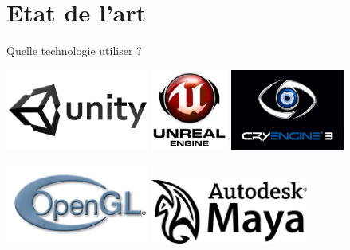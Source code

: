 \documentclass[a4paper,10pt]{beamer}
\begin{document}
	\section{Etat de l'art}
	
	\begin{frame}{Quelle technologie utiliser ?}
		
		\centerline{\includegraphics[height=75pt]{images/techno/unity-logo.png}
			\includegraphics[height=75pt]{images/techno/UE3_logo.png}
			\includegraphics[height=75pt]{images/techno/CryENGINE3-Logo.png}}
		
		\centerline{\includegraphics[height=75pt]{images/techno/opengl-logo.jpg}
			\includegraphics[height=60pt]{images/techno/auto.png}}
	\end{frame}
	
\end{document}
